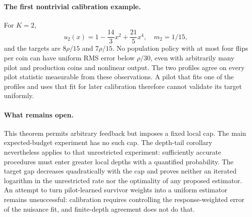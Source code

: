 \paragraph{The first nontrivial calibration example.}
For $K=2$,
\[
 u_2(x)=1-\frac{14}3x^2+\frac{21}5x^4,\quad m_2=1/15,
\]
and the targets are $8\rho/15$ and $7\rho/15$. No population policy with
at most four flips per coin can have uniform RMS error below $\rho/30$,
even with arbitrarily many pilot and production coins and nonlinear output.
The two profiles agree on every pilot statistic measurable from these
observations. A pilot that fits one of the profiles and uses that fit for
later calibration therefore cannot validate its target uniformly.

\paragraph{What remains open.}
This theorem permits arbitrary feedback but imposes a fixed local cap. The
main expected-budget experiment has no such cap. The depth-tail corollary
nevertheless applies to that unrestricted experiment: sufficiently accurate
procedures must enter greater local depths with a quantified probability.
The target gap decreases quadratically with the cap and proves neither an iterated logarithm in the
unrestricted rate nor the optimality of any proposed estimator. An attempt
to turn pilot-learned survivor weights into a uniform estimator remains
unsuccessful: calibration requires controlling the response-weighted error
of the nuisance fit, and finite-depth agreement does not do that.
